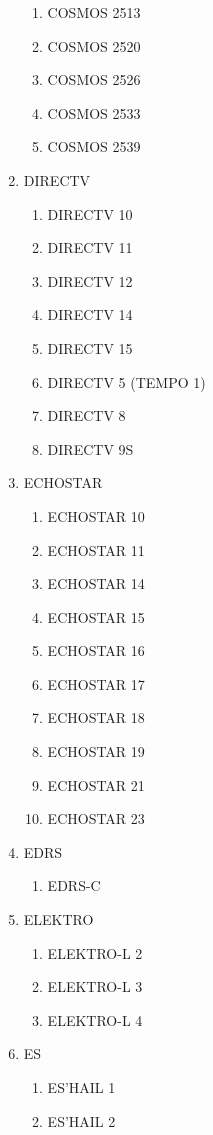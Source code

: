 \begin{multicols}{2}
\begin{enumerate}
\begin{enumerate}
    \item COSMOS 2513
    \item COSMOS 2520
    \item COSMOS 2526
    \item COSMOS 2533
    \item COSMOS 2539
  \end{enumerate}
  \item DIRECTV
  \begin{enumerate}
    \item DIRECTV 10
    \item DIRECTV 11
    \item DIRECTV 12
    \item DIRECTV 14
    \item DIRECTV 15
    \item DIRECTV 5 (TEMPO 1)
    \item DIRECTV 8
    \item DIRECTV 9S
  \end{enumerate}
  \item ECHOSTAR
  \begin{enumerate}
    \item ECHOSTAR 10
    \item ECHOSTAR 11
    \item ECHOSTAR 14
    \item ECHOSTAR 15
    \item ECHOSTAR 16
    \item ECHOSTAR 17
    \item ECHOSTAR 18
    \item ECHOSTAR 19
    \item ECHOSTAR 21
    \item ECHOSTAR 23
  \end{enumerate}
  \item EDRS
  \begin{enumerate}
    \item EDRS-C
  \end{enumerate}
  \item ELEKTRO
  \begin{enumerate}
    \item ELEKTRO-L 2
    \item ELEKTRO-L 3
    \item ELEKTRO-L 4
  \end{enumerate}
  \item ES
  \begin{enumerate}
    \item ES'HAIL 1
    \item ES'HAIL 2

\end{enumerate}
\end{enumerate}
\end{multicols}
